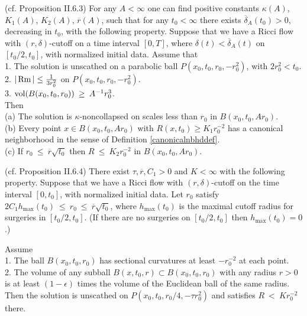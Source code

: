 \begin{proposition}
  \label{prop:kl-proof-double-sided-curvature-bound-thick-part-modulo-two-propositions-existence-canonical-neighborhoods}
 \label{propII.6.3}
(cf. Proposition II.6.3)
For any
$A < \infty$
one can find positive constants
$\kappa(A)$, $K_1(A)$, $K_2(A)$, $\overline{r}(A)$,
such that for any $t_0 < \infty$
there exists $\overline{\delta}_{A}(t_0)
> 0$, decreasing in $t_0$,
with the following property.  Suppose that
we have a Ricci flow with $(r, \delta)$-cutoff on a time interval
$[0, T]$, where $\delta(t) < \overline{\delta}_A(t)$ on $[t_0/2, t_0]$, with
normalized initial data.  Assume that \\
1. The solution is unscathed on a parabolic ball
$P(x_0, t_0, r_0, -r_0^2)$, with $2r_0^2 < t_0$. \\
2. $|\operatorname{Rm}| \le \frac{1}{3r_0^2}$ on $P(x_0, t_0, r_0, -r_0^2)$. \\
3. $\operatorname{vol}(B(x_0, t_0, r_0)) \: \ge \: A^{-1} r_0^3$.\\

Then\\
(a) The solution is $\kappa$-noncollapsed on scales less than $r_0$
in $B(x_0, t_0, Ar_0)$.\\
(b) Every point $x \in B(x_0, t_0, Ar_0)$ with $R(x, t_0) \ge K_1 r_0^{-2}$
has a canonical neighborhood in the sense of
Definition \ref{canonicalnbhddef}.\\
(c) If $r_0 \: \le \: \overline{r} \sqrt{t_0}$ then $R \: \le \: K_2
r_0^{-2}$ in $B(x_0, t_0, Ar_0)$.
\end{proposition}

\begin{proposition}
  \label{prop:kl-proof-double-sided-curvature-bound-thick-part-modulo-two-propositions-existence-thick-thin-geometry}
 \label{propII.6.4}
(cf. Proposition II.6.4)
There exist $\tau, \overline{r}, C_1 > 0$ and $K < \infty$ with the
following property. Suppose that we have a Ricci flow with $(r, \delta)$-cutoff
on the time interval $[0, t_0]$, with normalized initial data.
  Let $r_0$ satisfy
$2C_1 h_{\max}(t_0) \: \le \: r_0 \: \le \: \overline{r} \sqrt{t_0}$,
where $h_{\max}(t_0)$ is the maximal cutoff radius for surgeries in
$[t_0/2, t_0]$. (If there are no surgeries on $[t_0/2, t_0]$ then
$h_{\max}(t_0) = 0$.)

Assume \\
1. The ball $B(x_0, t_0, r_0)$ has sectional curvatures at least $- r_0^{-2}$
at each point. \\
2. The volume of any subball $B(x, t_0, r) \subset B(x_0, t_0, r_0)$ with
any radius $r > 0$ is at least $(1-\epsilon)$ times the volume of the
Euclidean ball of the same radius.\\

Then the solution is unscathed on
$P(x_0, t_0, r_0/4, - \tau r_0^2)$
and satisfies $R \: < \: K r_0^{-2}$ there.
\end{proposition}


